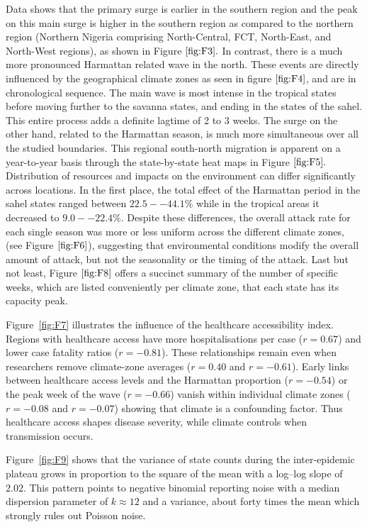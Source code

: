 \documentclass[12pt,a4paper]{article}
\theoremstyle{definition}
\theoremstyle{remark}
\begin{document}
Data shows that the primary surge is earlier in the southern region and the peak on this main surge is higher in the southern region as compared to the northern region (Northern Nigeria comprising North-Central, FCT, North-East, and North-West regions), as shown in Figure$~\ref{fig:F3}.$ In contrast, there is a much more pronounced Harmattan related wave in the north.
These events are directly influenced by the geographical climate zones as seen in figure$~\ref{fig:F4}$, and are in chronological sequence. The main wave is most intense in the tropical states before moving further to the savanna states, and ending in the states of the sahel. This entire process adds a definite lagtime of 2 to 3 weeks. The surge on the other hand, related to the Harmattan season, is much more simultaneous over all the studied boundaries. This regional south-north migration is apparent on a year-to-year basis through the state-by-state heat maps in Figure$~\ref{fig:F5}.$
Distribution of resources and impacts on the environment can differ significantly across locations. In the first place, the total effect of the Harmattan period in the sahel states ranged between $22.5--44.1\%$ while in the tropical areas it decreased to $9.0--22.4\%$. Despite these differences, the overall attack rate for each single season was more or less uniform across the different climate zones, (see Figure$~\ref{fig:F6}$), suggesting that environmental conditions modify the overall amount of attack, but not the seasonality or the timing of the attack. Last but not least, Figure$~\ref{fig:F8}$ offers a succinct summary of the number of specific weeks, which are listed conveniently per climate zone, that each state has its capacity peak.


Figure~\ref{fig:F7} illustrates the influence of the healthcare accessibility index. Regions with healthcare access have more hospitalisations per case ($r = 0.67$) and lower case fatality ratios ($r = -0.81$). These relationships remain even when researchers remove climate-zone averages ($r = 0.40$ and $r = -0.61$). Early links between healthcare access levels and the Harmattan proportion ($r = -0.54$) or the peak week of the wave ($r = -0.66$) vanish within individual climate zones ($r = -0.08$ and $r = -0.07$) showing that climate is a confounding factor. Thus healthcare access shapes disease severity, while climate controls when transmission occurs.

Figure~\ref{fig:F9} shows that the variance of state counts during the inter‑epidemic plateau grows in proportion to the square of the mean with a log–log slope of $2.02$. This pattern points to negative binomial reporting noise with a median dispersion parameter of $k \approx 12$ and a variance, about forty times the mean which strongly rules out Poisson noise.
\end{document}
